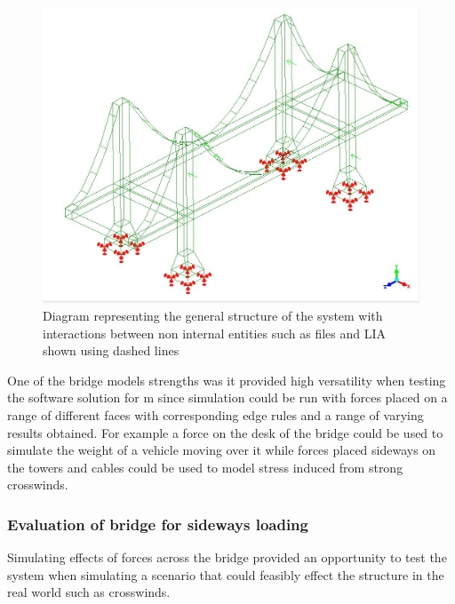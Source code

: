 \begin{figure}
  \centerline{\includegraphics[width=150mm, scale=1]{../Graphics/BasicBridge.jpeg}}
  \caption{Diagram representing the general structure of the system with interactions between non internal entities such as files and LIA shown using dashed lines}
  \label{fig:h-refinementImp}
\end{figure}


\newpage


\noindent
One of the bridge models strengths was it provided high versatility when testing the software solution for m since simulation could be run with forces placed on a range of different faces with corresponding edge rules and a range of varying results obtained. For example a force on the desk of the bridge could be used to simulate the weight of a vehicle moving over it while forces placed sideways on the towers and cables could be used to model stress induced from strong crosswinds.

\subsubsection{Evaluation of bridge for sideways loading}
Simulating effects of forces across the bridge provided an opportunity  to test the system when simulating a scenario that could feasibly effect the structure in the real world such as crosswinds.


